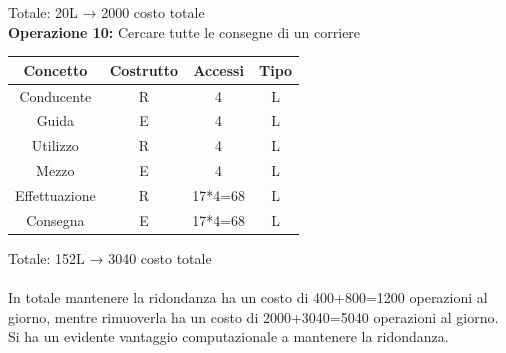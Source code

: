 \documentclass[a4paper,12pt]{report}
\begin{document}
Totale: 20L → 2000 costo totale\\
\textbf{Operazione 10:}
Cercare tutte le consegne di un corriere\\
\begin{center}
    \begin{tabular}{ | c   c   c   c | } 
    \hline
	Concetto&Costrutto&Accessi&Tipo\\
	\hline
	Conducente&R&4&L\\
	\hline
	Guida&E&4&L\\
	\hline
	Utilizzo&R&4&L\\
	\hline
	Mezzo&E&4&L\\
	\hline
	Effettuazione&R&17*4=68&L\\
	\hline
    Consegna&E&17*4=68&L\\
	\hline
	\end{tabular}
\end{center}
Totale: 152L → 3040 costo totale\\
\\
In totale mantenere la ridondanza ha un costo di 400+800=1200 operazioni al giorno, mentre rimuoverla ha un costo di 2000+3040=5040 operazioni al giorno. Si ha un evidente vantaggio computazionale a mantenere la ridondanza.\\
\end{document}
